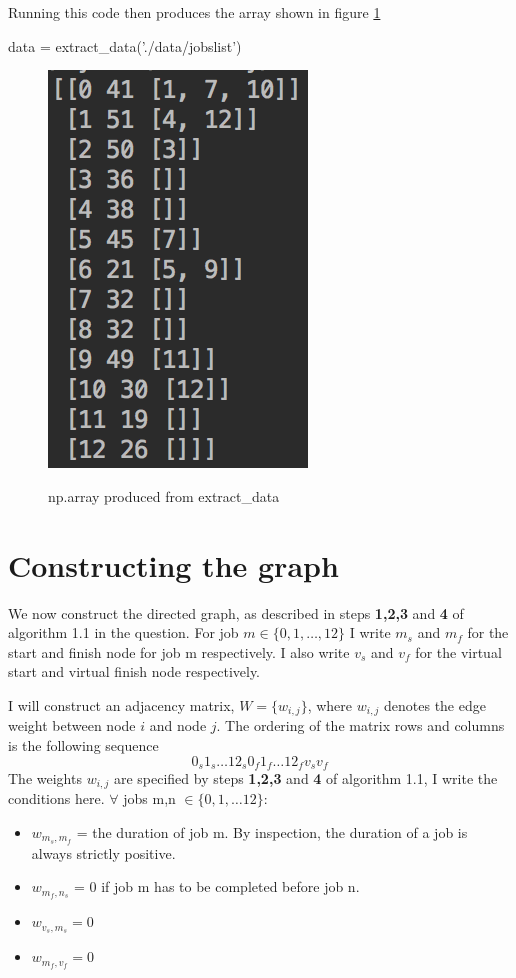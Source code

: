 \documentclass[paper=a4, fontsize=12pt]{scrartcl} %
\numberwithin{equation}{section}       %
\numberwithin{figure}{section}         %
\numberwithin{table}{section}          %
\begin{document}
Running this code then produces the array shown in figure \ref{data}
\begin{python}
data = extract_data('./data/jobslist')
\end{python}

\begin{figure}[t]
\caption{np.array produced from extract\_data}
\centering
\includegraphics{data}\label{data}
\end{figure}

\section{Constructing the graph}
We now construct the directed graph, as described in steps \textbf{1,2,3} and \textbf{4} of algorithm 1.1 in the question. For job $m \in \{ 0,1,\dots, 12 \}$ I write $m_{s}$ and $m_{f}$ for the start and finish node for job m respectively. I also write $v_{s}$ and $v_{f}$ for the virtual start and virtual finish node respectively.

I will construct an adjacency matrix, $W = \{ w_{i,j} \}$, where $w_{i,j}$ denotes the edge weight between node $i$ and node $j$. The ordering of the matrix rows and columns is the following sequence $$ 0_{s} 1_{s} \dots 12_{s} 0_{f} 1_{f} \dots 12_{f} v_{s} v_{f}$$
The weights $w_{i,j}$ are specified by steps \textbf{1,2,3} and \textbf{4} of algorithm 1.1, I write the conditions here. $\forall$ jobs m,n $\in \{ 0,1,\dots 12\}$:
\begin{itemize}
  \item $w_{m_{s},m_{f}}$ = the duration of job m. By inspection, the duration of a job is always strictly positive.
  \item $w_{m_{f},n_{s}}$ = 0 if job m has to be completed before job n.
  \item $w_{v_{s},m_{s}} = 0$
  \item $w_{m_{f},v_{f}} = 0$
\end{itemize}
\end{document}
